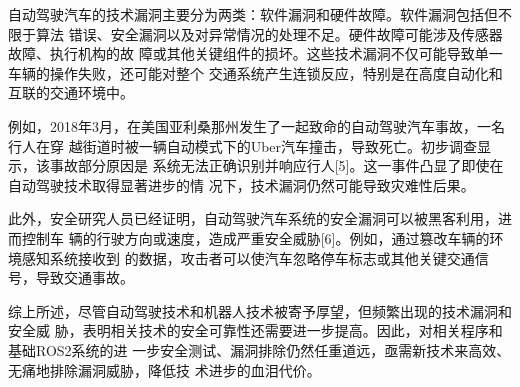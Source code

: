 自动驾驶汽车的技术漏洞主要分为两类：软件漏洞和硬件故障。软件漏洞包括但不限于算法
错误、安全漏洞以及对异常情况的处理不足。硬件故障可能涉及传感器故障、执行机构的故
障或其他关键组件的损坏。这些技术漏洞不仅可能导致单一车辆的操作失败，还可能对整个
交通系统产生连锁反应，特别是在高度自动化和互联的交通环境中。

例如，2018年3月，在美国亚利桑那州发生了一起致命的自动驾驶汽车事故，一名行人在穿
越街道时被一辆自动模式下的Uber汽车撞击，导致死亡。初步调查显示，该事故部分原因是
系统无法正确识别并响应行人[5]。这一事件凸显了即使在自动驾驶技术取得显著进步的情
况下，技术漏洞仍然可能导致灾难性后果。

此外，安全研究人员已经证明，自动驾驶汽车系统的安全漏洞可以被黑客利用，进而控制车
辆的行驶方向或速度，造成严重安全威胁[6]。例如，通过篡改车辆的环境感知系统接收到
的数据，攻击者可以使汽车忽略停车标志或其他关键交通信号，导致交通事故。

综上所述，尽管自动驾驶技术和机器人技术被寄予厚望，但频繁出现的技术漏洞和安全威
胁，表明相关技术的安全可靠性还需要进一步提高。因此，对相关程序和基础ROS2系统的进
一步安全测试、漏洞排除仍然任重道远，亟需新技术来高效、无痛地排除漏洞威胁，降低技
术进步的血泪代价。

